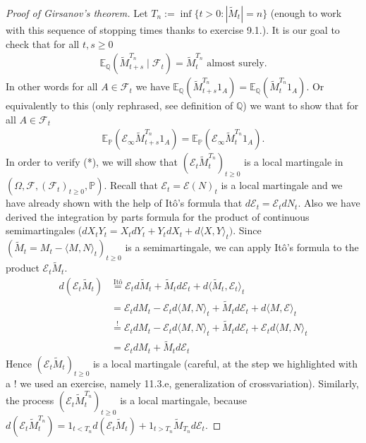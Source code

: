 \documentclass[../mainfile.tex]{subfiles}
\begin{document}
\begin{proof}[Proof of Girsanov's theorem] Let $T_n:= \inf \{ t >0 : |\tilde{M}_t|=n \}$ (enough to work with this sequence of stopping times thanks to exercise 9.1.). It is our goal to check that for all $t, s \geq 0$ 
\begin{align*}
\mathbb{E}_\mathbb{Q}( \tilde{M}_{t+s}^{T_n} \mid \mathcal{F}_t) = \tilde{M}_t^{T_n} \text{ almost surely}.
\end{align*}
In other words for all $A \in \mathcal{F}_t$ we have $\mathbb{E}_\mathbb{Q}( \tilde{M}_{t+s}^{T_n} 1_A)= \mathbb{E}_\mathbb{Q}( \tilde{M}_t^{T_n} 1_A).$ Or equivalently to this (only rephrased, see definition of $\mathbb{Q}$) we want to show that for all $A \in \mathcal{F}_t$ 
\begin{align*}
\mathbb{E}_\mathbb{P}( \mathcal{E}_\infty \tilde{M}_{t+s}^{T_n}1_A)= \mathbb{E}_\mathbb{P}( \mathcal{E}_\infty \tilde{M}_t^{T_n} 1_A). \tag{*}
\end{align*} 
In order to verify (*), we will show that $( \mathcal{E}_t \tilde{M}_t^{T_n})_{t \geq 0}$ is a local martingale in $( \Omega, \mathcal{F}, (\mathcal{F}_t)_{t \geq 0}, \mathbb{P})$. 
\newpage
Recall that $\mathcal{E}_t= \mathcal{E}(N)_t$ is a local martingale and we have already shown with the help of Itô's formula that $d \mathcal{E}_t= \mathcal{E}_t d N_t$. Also we have derived the integration by parts formula for the product of continuous semimartingales ($dX_tY_t= X_tdY_t + Y_tdX_t + d\langle X,Y \rangle_t)$. Since $(\tilde{M}_t= M_t- \langle M,N \rangle_t)_{t \geq 0}$ is a semimartingale, we can apply Itô's formula to the product $\mathcal{E}_t \tilde{M}_t$. 
\begin{align*}
d( \mathcal{E}_t \tilde{M}_t)&\overset{\text{Itô}}=\mathcal{E}_t d \tilde{M}_t + \tilde{M}_t d \mathcal{E}_t + d \langle \tilde{M}_t, \mathcal{E}_t \rangle_t  \\
&= \mathcal{E}_t d M_t - \mathcal{E}_t d \langle M, N \rangle_t + \tilde{M}_t d \mathcal{E}_t + d \langle M, \mathcal{E} \rangle_t \\
&\overset{!}= \mathcal{E}_t d M_t - \mathcal{E}_t d \langle M, N \rangle_t + \tilde{M}_t d \mathcal{E}_t + \mathcal{E}_td \langle M, N \rangle_t  \\
&= \mathcal{E}_t d M_t + \tilde{M}_t d \mathcal{E}_t
\end{align*}
Hence $( \mathcal{E}_t \tilde{M}_t)_{t \geq 0}$ is a local martingale (careful, at the step we highlighted with a ! we used an exercise, namely 11.3.e, generalization of crossvariation). Similarly, the process $( \mathcal{E}_t \tilde{M}_t^{T_n})_{t \geq 0}$ is a local martingale, because $d( \mathcal{E}_t \tilde{M}_t^{T_n}) = 1_{t < T_n} d( \mathcal{E}_t \tilde{M}_t)+ 1_{t > T_n} \tilde{M}_{T_n} d \mathcal{E}_t$. 

\end{proof}
\end{document}
